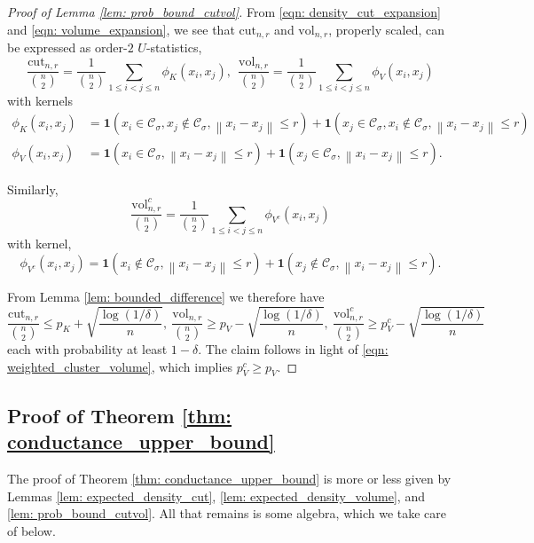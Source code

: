 \documentclass{article}
\newcommand{\vol}{\mathrm{vol}}
\newcommand{\norm}[1]{\left\lVert#1\right\rVert}
\newcommand{\1}{\mathbf{1}}
\newcommand{\cut}{\mathrm{cut}}
\newcommand{\Cset}{\mathcal{C}}
\newcommand{\Csig}{\Cset_{\sigma}}
\theoremstyle{aldenthm}
\begin{document}
\begin{proof}[Proof of Lemma \ref{lem: prob_bound_cutvol}]
	From \eqref{eqn: density_cut_expansion} and \eqref{eqn: volume_expansion}, we see that $\cut_{n,r}$ and $\vol_{n,r}$, properly scaled, can be expressed as order-$2$ $U$-statistics,
	\begin{equation*}
	\frac{\cut_{n,r}}{{n \choose 2}} = \frac{1}{{n \choose 2}} \sum_{1 \leq i < j \leq n} \phi_K(x_i, x_j),~~ \frac{\vol_{n,r}}{{n \choose 2}} = \frac{1}{{n \choose 2}} \sum_{1 \leq i < j \leq n} \phi_V(x_i, x_j)
	\end{equation*}
	with kernels
	\begin{align*}
	\phi_K(x_i,x_j) & = \1(x_i \in \Csig, x_j \not\in \Csig, \norm{x_i - x_j} \leq r) + \1(x_j \in \Csig, x_i \not\in \Csig, \norm{x_i - x_j} \leq r) \\
	\phi_V(x_i,x_j) & = \1(x_i \in \Csig, \norm{x_i - x_j} \leq r) + \1(x_j \in \Csig, \norm{x_i - x_j} \leq r). 
	\end{align*}
	
	Similarly,
	\begin{equation*}
	\frac{\vol_{n,r}^c}{{n \choose 2}} = \frac{1}{{n \choose 2}} \sum_{1 \leq i < j \leq n} \phi_{V^c}(x_i, x_j)
	\end{equation*}
	with kernel,
	\begin{equation*}
	\phi_{V^c}(x_i,x_j) = \1(x_i \not\in \Csig, \norm{x_i - x_j} \leq r) + \1(x_j \not\in \Csig, \norm{x_i - x_j} \leq r). 
	\end{equation*}
	
	From Lemma \ref{lem: bounded_difference} we therefore have
	\begin{equation*}
	\frac{\cut_{n,r}}{{n \choose 2}} \leq p_K + \sqrt{\frac{\log(1/\delta)}{n}},~  \frac{\vol_{n,r}}{{n \choose 2}} \geq p_V - \sqrt{\frac{\log(1/\delta)}{n}}, ~ \frac{\vol_{n,r}^c}{{n \choose 2}} \geq p_V^c - \sqrt{\frac{\log(1/\delta)}{n}}
	\end{equation*}
	each with probability at least $1 - \delta$. The claim follows in light of \eqref{eqn: weighted_cluster_volume}, which implies $p_V^c \geq p_V$. 
\end{proof}

\subsection{Proof of Theorem \ref{thm: conductance_upper_bound}}
\label{sec: proof_of_theorem_1}

The proof of Theorem \ref{thm: conductance_upper_bound} is more or less given by Lemmas \ref{lem: expected_density_cut}, \ref{lem: expected_density_volume}, and \ref{lem: prob_bound_cutvol}. All that remains is some algebra, which we take care of below.
\end{document}
